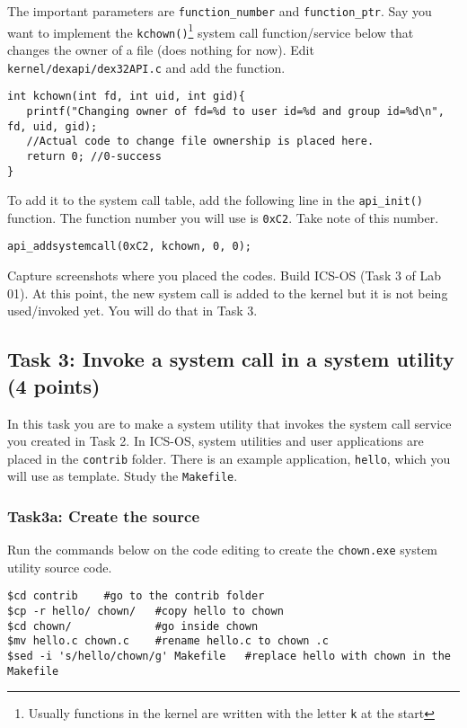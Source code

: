 \documentclass[a4paper, 11pt,oneside]{article}
\begin{document}
The important parameters are \texttt{function\_number} and 
\texttt{function\_ptr}. Say you want to implement the 
\texttt{kchown()}\footnote{Usually functions in the kernel are written with the 
letter \texttt{k} at the start} system call function/service below that changes 
the owner of a file (does nothing for now). Edit  
\texttt{kernel/dexapi/dex32API.c} and add the function.

\begin{verbatim}
int kchown(int fd, int uid, int gid){
   printf("Changing owner of fd=%d to user id=%d and group id=%d\n", fd, uid, gid);
   //Actual code to change file ownership is placed here.   
   return 0; //0-success
}
\end{verbatim}

To add it to the system call table, add the following line in the 
\texttt{api\_init()} function. The function number you will use is 
\texttt{0xC2}. Take note of this number.

\begin{verbatim}
api_addsystemcall(0xC2, kchown, 0, 0);
\end{verbatim}

Capture screenshots where you placed the codes. 
Build ICS-OS (Task 3 of Lab 01). At this point, the new system call is added to 
the kernel but it 
is not being used/invoked yet. You will do that in Task 3. 

\subsection*{Task 3: Invoke a system call in a system utility (4 points)}
In this task you are to make a system utility that invokes the system call 
service you created in Task 2. In ICS-OS, system utilities and user 
applications are placed in the \texttt{contrib} folder. There is an example 
application, \texttt{hello}, which you will use as template. Study the 
\texttt{Makefile}. 

\subsubsection*{Task3a: Create the source}
Run the commands below on the code editing to create the  
\texttt{chown.exe} system utility source code.

\begin{verbatim}
$cd contrib	   #go to the contrib folder
$cp -r hello/ chown/   #copy hello to chown
$cd chown/             #go inside chown
$mv hello.c chown.c    #rename hello.c to chown .c
$sed -i 's/hello/chown/g' Makefile   #replace hello with chown in the Makefile
\end{verbatim}
\end{document}
